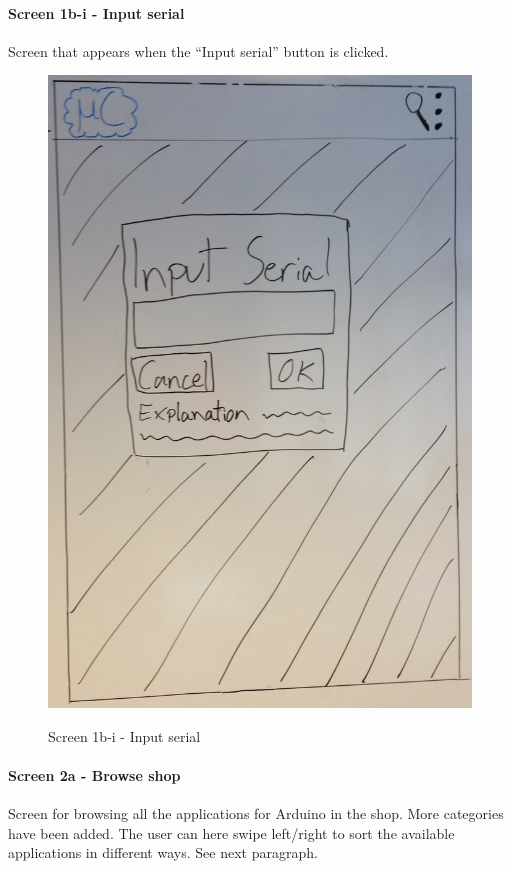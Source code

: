 \paragraph{Screen 1b-i - Input serial}
Screen that appears when the ``Input serial'' button is clicked.

\begin{figure}[H]
\centering
\includegraphics[scale=0.2]{images/Design_guide/Screen1b-i.png}
\label{fig:1b-i}
\caption{Screen 1b-i - Input serial}
\end{figure}


\paragraph{Screen 2a - Browse shop}
Screen for browsing all the applications for Arduino in the shop. More categories have been added. The user can here swipe left/right to sort the available applications in different ways. See next paragraph.

